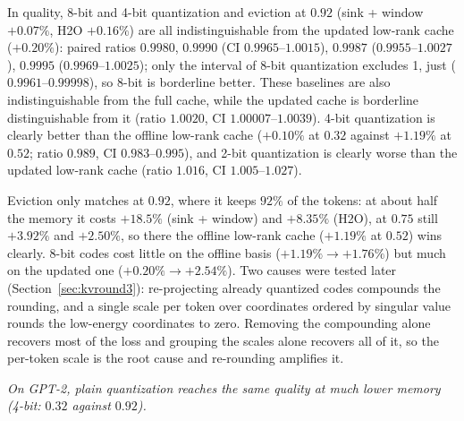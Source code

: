 \documentclass[10pt]{article}
\theoremstyle{plain}
\theoremstyle{definition}
\theoremstyle{remark}
\begin{document}
In quality, 8-bit and 4-bit quantization and eviction at $0.92$ (sink + window $+0.07\%$, H2O $+0.16\%$) are all indistinguishable from the updated low-rank cache ($+0.20\%$): paired ratios $0.9980$, $0.9990$ (CI $0.9965$--$1.0015$), $0.9987$ ($0.9955$--$1.0027$), $0.9995$ ($0.9969$--$1.0025$); only the interval of 8-bit quantization excludes 1, just ($0.9961$--$0.99998$), so 8-bit is borderline better. These baselines are also indistinguishable from the full cache, while the updated cache is borderline distinguishable from it (ratio $1.0020$, CI $1.00007$--$1.0039$). 4-bit quantization is clearly better than the offline low-rank cache ($+0.10\%$ at $0.32$ against $+1.19\%$ at $0.52$; ratio $0.989$, CI $0.983$--$0.995$), and 2-bit quantization is clearly worse than the updated low-rank cache (ratio $1.016$, CI $1.005$--$1.027$).

Eviction only matches at $0.92$, where it keeps $92\%$ of the tokens: at about half the memory it costs $+18.5\%$ (sink + window) and $+8.35\%$ (H2O), at $0.75$ still $+3.92\%$ and $+2.50\%$, so there the offline low-rank cache ($+1.19\%$ at $0.52$) wins clearly. 8-bit codes cost little on the offline basis ($+1.19\%\to+1.76\%$) but much on the updated one ($+0.20\%\to+2.54\%$). Two causes were tested later (Section~\ref{sec:kvround3}): re-projecting already quantized codes compounds the rounding, and a single scale per token over coordinates ordered by singular value rounds the low-energy coordinates to zero. Removing the compounding alone recovers most of the loss and grouping the scales alone recovers all of it, so the per-token scale is the root cause and re-rounding amplifies it.

\emph{On GPT-2, plain quantization reaches the same quality at much lower memory (4-bit: $0.32$ against $0.92$).}
\end{document}
